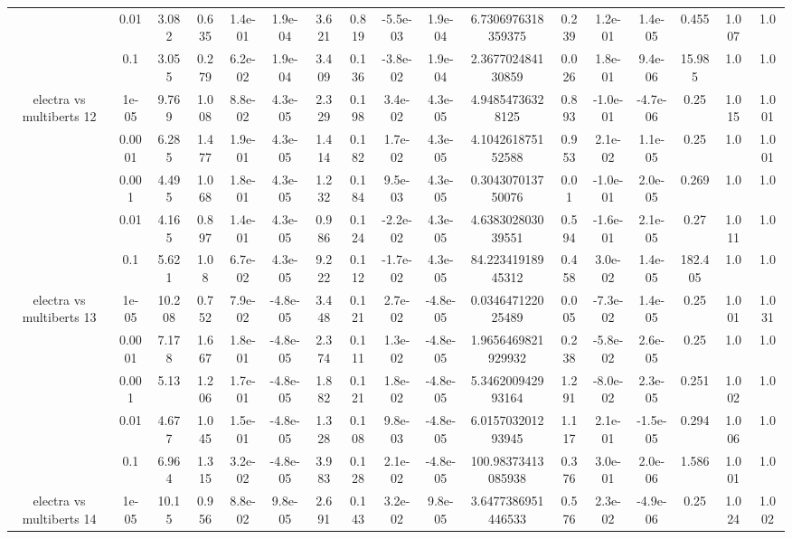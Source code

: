 \begin{tabular}{|c|c|c|c|c|c|c|c|c|c|c|c|c|c|c|c|c|}
 & 0.01 & 3.082 & 0.635 & 1.4e-01 & 1.9e-04 & 3.621 & 0.819 & -5.5e-03 & 1.9e-04 & 6.7306976318359375 & 0.239 & 1.2e-01 & 1.4e-05 & 0.455 & 1.007 & 1.0 \\
 & 0.1 & 3.055 & 0.279 & 6.2e-02 & 1.9e-04 & 3.409 & 0.136 & -3.8e-02 & 1.9e-04 & 2.367702484130859 & 0.026 & 1.8e-01 & 9.4e-06 & 15.985 & 1.0 & 1.0 \\
\hline
\multirow{5}{*}{electra  vs multiberts 12} & 1e-05 & 9.769 & 1.008 & 8.8e-02 & 4.3e-05 & 2.329 & 0.198 & 3.4e-02 & 4.3e-05 & 4.94854736328125 & 0.893 & -1.0e-01 & -4.7e-06 & 0.25 & 1.015 & 1.001 \\
 & 0.0001 & 6.285 & 1.477 & 1.9e-01 & 4.3e-05 & 1.414 & 0.182 & 1.7e-02 & 4.3e-05 & 4.104261875152588 & 0.953 & 2.1e-02 & 1.1e-05 & 0.25 & 1.0 & 1.001 \\
 & 0.001 & 4.495 & 1.068 & 1.8e-01 & 4.3e-05 & 1.232 & 0.184 & 9.5e-03 & 4.3e-05 & 0.304307013750076 & 0.01 & -1.0e-01 & 2.0e-05 & 0.269 & 1.0 & 1.0 \\
 & 0.01 & 4.165 & 0.897 & 1.4e-01 & 4.3e-05 & 0.986 & 0.124 & -2.2e-02 & 4.3e-05 & 4.638302803039551 & 0.594 & -1.6e-01 & 2.1e-05 & 0.27 & 1.011 & 1.0 \\
 & 0.1 & 5.621 & 1.08 & 6.7e-02 & 4.3e-05 & 9.222 & 0.112 & -1.7e-02 & 4.3e-05 & 84.22341918945312 & 0.458 & 3.0e-02 & 1.4e-05 & 182.405 & 1.0 & 1.0 \\
\hline
\multirow{5}{*}{electra  vs multiberts 13} & 1e-05 & 10.208 & 0.752 & 7.9e-02 & -4.8e-05 & 3.448 & 0.121 & 2.7e-02 & -4.8e-05 & 0.034647122025489 & 0.005 & -7.3e-02 & 1.4e-05 & 0.25 & 1.001 & 1.031 \\
 & 0.0001 & 7.178 & 1.667 & 1.8e-01 & -4.8e-05 & 2.374 & 0.111 & 1.3e-02 & -4.8e-05 & 1.9656469821929932 & 0.238 & -5.8e-02 & 2.6e-05 & 0.25 & 1.0 & 1.0 \\
 & 0.001 & 5.13 & 1.206 & 1.7e-01 & -4.8e-05 & 1.882 & 0.121 & 1.8e-02 & -4.8e-05 & 5.346200942993164 & 1.291 & -8.0e-02 & 2.3e-05 & 0.251 & 1.002 & 1.0 \\
 & 0.01 & 4.677 & 1.045 & 1.5e-01 & -4.8e-05 & 1.328 & 0.108 & 9.8e-03 & -4.8e-05 & 6.015703201293945 & 1.117 & 2.1e-01 & -1.5e-05 & 0.294 & 1.006 & 1.0 \\
 & 0.1 & 6.964 & 1.315 & 3.2e-02 & -4.8e-05 & 3.983 & 0.128 & 2.1e-02 & -4.8e-05 & 100.98373413085938 & 0.376 & 3.0e-01 & 2.0e-06 & 1.586 & 1.001 & 1.0 \\
\hline
\multirow{5}{*}{electra  vs multiberts 14} & 1e-05 & 10.15 & 0.956 & 8.8e-02 & 9.8e-05 & 2.691 & 0.143 & 3.2e-02 & 9.8e-05 & 3.6477386951446533 & 0.576 & 2.3e-02 & -4.9e-06 & 0.25 & 1.024 & 1.002 \\

\end{tabular}
